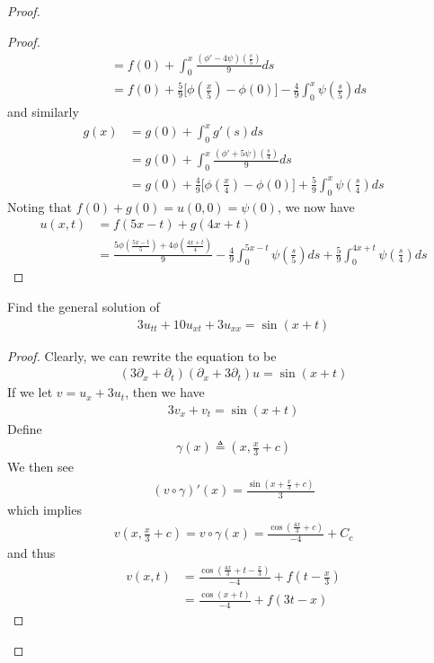 \documentclass{report}
\begin{document}
\begin{proof}
\begin{proof}
\begin{align*}
&=f(0)+\int_0^x \frac{(\phi' -4\psi)(\frac{s}{5})}{9}ds \\
&=f(0)+ \frac{5}{9}\Big[\phi (\frac{x}{5})-\phi (0) \Big] - \frac{4}{9}\int_0^x \psi (\frac{s}{5})ds
\end{align*}
and similarly 
\begin{align*}
g(x)&=g(0)+\int_0^x g'(s)ds \\
&=g(0)+ \int_0^x \frac{(\phi ' +5 \psi )(\frac{s}{4})}{9}ds \\
&=g(0)+ \frac{4}{9}\Big[ \phi (\frac{x}{4})- \phi (0) \Big]+\frac{5}{9} \int_0^x \psi (\frac{s}{4})ds
\end{align*}
Noting that $f(0)+g(0)=u(0,0)=\psi (0)$, we now have
\begin{align*}
u(x,t)&=f(5x-t)+g(4x+t) \\
&=\frac{5\phi (\frac{5x-t}{5})+4 \phi (\frac{4x+t}{4})}{9} - \frac{4}{9}\int_0^{5x-t}\psi (\frac{s}{5})ds + \frac{5}{9}\int_0^{4x+t}\psi (\frac{s}{4})ds
\end{align*}
\end{proof}
\begin{question}{}{}
Find the general solution of 
\begin{align*}
3u_{tt}+10u_{xt}+3u_{xx}=\sin (x+t)
\end{align*}
\end{question}
\begin{proof}
Clearly, we can rewrite the equation to be 
\begin{align*}
  (3\partial_x + \partial_t )(\partial_x + 3\partial_t)u=\sin (x+t)
\end{align*}
If we let $v=u_x+3u_t$, then  we have 
\begin{align*}
3v_x+v_t= \sin (x+t)
\end{align*}
Define 
\begin{align*}
\gamma (x)\triangleq  (x, \frac{x}{3}+c)
\end{align*}
We then see 
\begin{align*}
  (v\circ \gamma )'(x)= \frac{\sin (x+ \frac{x}{3}+c)}{3}
\end{align*}
which implies 
\begin{align*}
v(x, \frac{x}{3}+c) = v\circ \gamma  (x)= \frac{\cos (\frac{4x}{3}+c)}{-4}+ C_c
\end{align*}
and thus 
\begin{align*}
v(x,t)&= \frac{\cos (\frac{4x}{3}+ t- \frac{x}{3})}{-4}+f(t-\frac{x}{3})\\
&= \frac{\cos (x+t)}{-4}+f(3t-x)
\end{align*}

\end{proof}
\end{proof}
\end{document}
